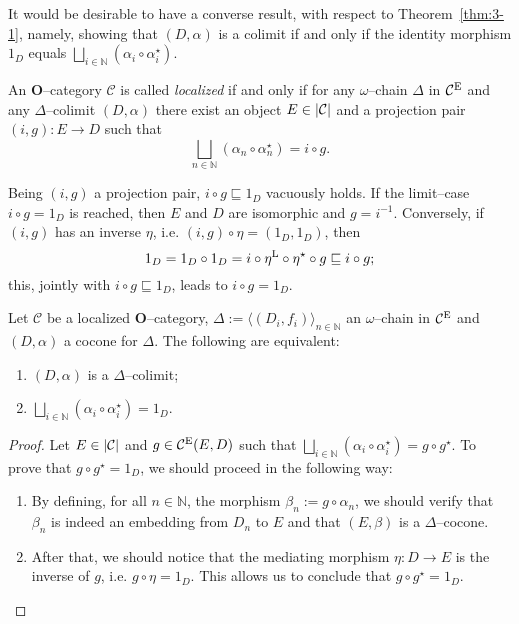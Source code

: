 It would be desirable to have a converse result, with respect to Theorem~\ref{thm:3-1}, namely, showing that \((D,\alpha)\) is a colimit if and only if the identity morphism \(1_D\) equals \(\bigsqcup_{i \in \mathbb{N}}(\alpha_i \circ \alpha_i^\star)\).

\begin{dfn}\label{dfn:localized}
  An \(\mathbf{O}\)--category \(\mathcal{C}\) is called \emph{localized} if and only if for any \(\omega{}\)--chain \(\Delta{}\) in \(\mathcal{C}^\textup{E}\) and any \(\Delta{}\)--colimit \((D,\alpha)\) there exist an object \(E \in \lvert \mathcal{C} \rvert\) and a projection pair \((i,g) \colon E \to D\) such that
  \begin{equation*}
    \bigsqcup_{n \in \mathbb{N}}(\alpha_n \circ \alpha_n^\star) = i \circ g.
  \end{equation*}
\end{dfn}

Being \((i,g)\) a projection pair, \(i \circ g \sqsubseteq 1_D\) vacuously holds. If the limit--case \(i \circ g = 1_D\) is reached, then \(E\) and \(D\) are isomorphic and \(g = i^{-1}\). %
Conversely, if \((i,g)\) has an inverse \(\eta{}\), i.e. \((i,g) \circ \eta = (1_D,1_D)\), then
\begin{equation*}
    1_D = 1_D \circ 1_D = i \circ \eta^\textup{L} \circ \eta^\star \circ g
    \sqsubseteq i \circ g;
\end{equation*}
this, jointly with \(i \circ g \sqsubseteq 1_D\), leads to \(i \circ g = 1_D\).

\begin{thm}\label{thm:3-2}
  Let \(\mathcal{C}\) be a localized \(\mathbf{O}\)--category, \(\Delta := {\langle(D_i,f_i)\rangle}_{n \in \mathbb{N}}\) an \(\omega{}\)--chain in \(\mathcal{C}^\textup{E}\) and \((D,\alpha)\) a cocone for \(\Delta{}\). The following are equivalent:
  \begin{enumerate}
    \item \((D,\alpha)\) is a \(\Delta{}\)--colimit;
    \item \(\bigsqcup_{i \in \mathbb{N}}(\alpha_i \circ \alpha_i^\star) = 1_D\).
  \end{enumerate}
\end{thm}
\begin{proof}
  Let \(E \in \lvert \mathcal{C} \rvert\) and \(g \in \mathcal{C}^\textup{E}(E,D)\) such that \(\bigsqcup_{i \in \mathbb{N}}(\alpha_i \circ \alpha_i^\star) = g \circ g^\star\).
  To prove that \(g \circ g^\star = 1_D\), we should proceed in the following way:
  \begin{enumerate}
    \item By defining, for all \(n \in \mathbb{N}\), the morphism \(\beta_n := g \circ \alpha_n\), we should verify that \(\beta_n\) is indeed an embedding from \(D_n\) to \(E\) and that \((E,\beta)\) is a \(\Delta\)--cocone.
    \item After that, we should notice that the mediating morphism \(\eta \colon D \to E\) is the inverse of \(g\), i.e. \(g \circ \eta = 1_D\).
    This allows us to conclude that \(g \circ g^\star = 1_D\).
  \end{enumerate}
\end{proof}

